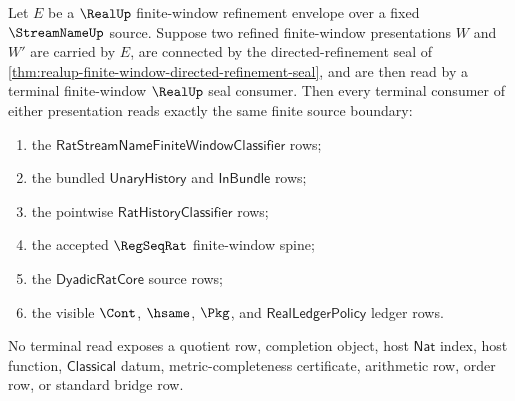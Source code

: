 \begin{theorem}
\label{thm:realup-terminal-refinement-seal-boundary}
Let $E$ be a $\RealUp$ finite-window refinement envelope over a fixed
$\StreamNameUp$ source. Suppose two refined finite-window presentations
$W$ and $W'$ are carried by $E$, are connected by the directed-refinement seal
of \autoref{thm:realup-finite-window-directed-refinement-seal}, and are then
read by a terminal finite-window $\RealUp$ seal consumer. Then every terminal
consumer of either presentation reads exactly the same finite source
boundary:
\begin{enumerate}
  \item the $\mathsf{RatStreamNameFiniteWindowClassifier}$ rows;
  \item the bundled $\mathsf{UnaryHistory}$ and $\mathsf{InBundle}$ rows;
  \item the pointwise $\mathsf{RatHistoryClassifier}$ rows;
  \item the accepted $\RegSeqRat$ finite-window spine;
  \item the $\mathsf{DyadicRatCore}$ source rows;
  \item the visible $\Cont$, $\hsame$, $\Pkg$, and
  $\mathsf{RealLedgerPolicy}$ ledger rows.
\end{enumerate}
No terminal read exposes a quotient row, completion object, host
$\mathsf{Nat}$ index, host function, $\mathsf{Classical}$ datum,
metric-completeness certificate, arithmetic row, order row, or standard bridge
row.
\end{theorem}
